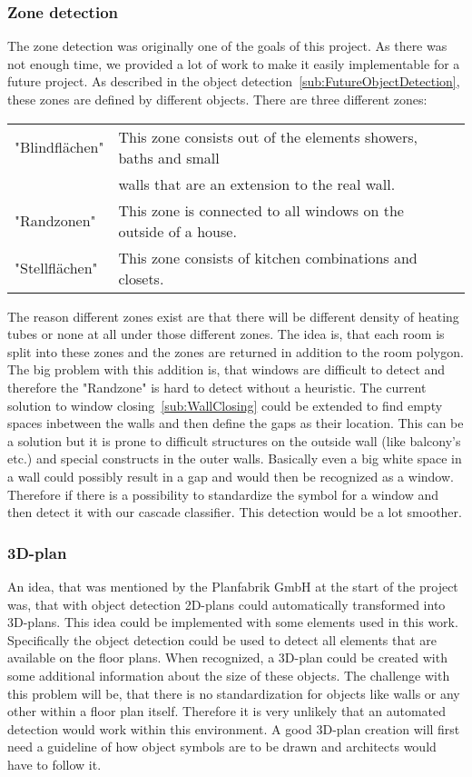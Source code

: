 \subsubsection{Zone detection}
\label{sub:RoomZones}
\label{sub:ZoneDetection}
The zone detection was originally one of the goals of this project. As there was not enough time, we provided a lot of work to make it easily implementable for a future project. As described in the object detection~\ref{sub:FutureObjectDetection}, these zones are defined by different objects.
There are three different zones:
\begin{table}[H]
	\centering
	\label{tab:Zones}
	\begin{tabular}{@{}lll@{}}
		"Blindflächen" & This zone consists out of the elements showers, baths and small \\
		& walls that are an extension to the real wall.\\
		"Randzonen" &  This zone is connected to all windows on the outside of a house. \\
		"Stellflächen" & This zone consists of kitchen combinations and closets.\\
	\end{tabular}
\end{table}	

The reason different zones exist are that there will be different density of heating tubes or none at all under those different zones. The idea is, that each room is split into these zones and the zones are returned in addition to the room polygon. The big problem with this addition is, that windows are difficult to detect and therefore the "Randzone" is hard to detect without a heuristic. The current solution to window closing~\ref{sub:WallClosing} could be extended to find empty spaces inbetween the walls and then define the gaps as their location. This can be a solution but it is prone to difficult structures on the outside wall (like balcony's etc.) and special constructs in the outer walls. Basically even a big white space in a wall could possibly result in a gap and would then be recognized as a window. Therefore if there is a possibility to standardize the symbol for a window and then detect it with our cascade classifier. This detection would be a lot smoother.

\subsubsection{3D-plan}
An idea, that was mentioned by the Planfabrik GmbH at the start of the project was, that with object detection 2D-plans could automatically transformed into 3D-plans. This idea could be implemented with some elements used in this work. Specifically the object detection could be used to detect all elements that are available on the floor plans. When recognized, a 3D-plan could be created with some additional information about the size of these objects. The challenge with this problem will be, that there is no standardization for objects like walls or any other within a floor plan itself. Therefore it is very unlikely that an automated detection would work within this environment. A good 3D-plan creation will first need a guideline of how object symbols are to be drawn and architects would have to follow it.


